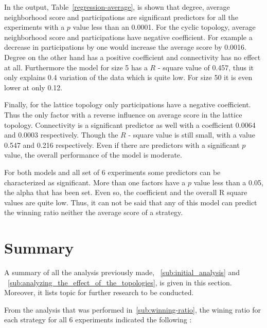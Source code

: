 In the output, Table~\ref{regression-average}, is shown that degree, average
neighborhood score and participations
are significant predictors for all the experiments with a \(p\) value less than
an 0.0001.
For the cyclic topology, average neighborhood score and participations have negative
coefficient. For example a decrease in participations by one would increase
the average score by 0.0016. Degree on the other hand has a positive coefficient
and connectivity has no effect at all. Furthermore the model for size 5 has
a \(R\) - square value of 0.457, thus it only explains 0.4 variation of the data which is
quite low. For size 50 it is even lower at only 0.12.

Finally, for the lattice topology only participations have a negative coefficient.
Thus the only factor with a reverse influence on average score in the lattice topology.
Connectivity is a significant predictor as well with a coefficient 0.0064 and
0.0003 respectively. Though the \(R\) - square value is still  small,
with a value 0.547 and 0.216 respectively.
Even if there are predictors with a significant \(p\) value, the overall
performance of the model is moderate.

For both models and all set of 6 experiments some predictors can be characterized
as significant. More than one factors have a \(p\) value less than a 0.05, the alpha
that has been set. Even so, the coefficient and the overall R square values are
quite low. Thus, it can not be said that any of this model can predict the
winning ratio neither the average score of a strategy.

\section{Summary}
\label{sub:summary}

A summary of all the analysis previously made, ~\ref{sub:initial_analysis} and
~\ref{sub:analyzing_the_effect_of_the_topologies}, is given in this section.
Moreover, it lists topic for further research to be conducted.

From the analysis that was performed in~\ref{sub:winning-ratio}, the wining ratio
for each strategy for all 6 experiments indicated the following :

